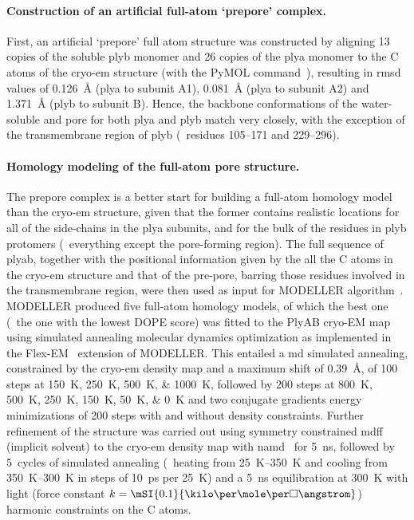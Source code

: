 \paragraph{Construction of an artificial full-atom `prepore' complex.}
%
First, an artificial `prepore' full atom structure was constructed by aligning 13 copies of the soluble
\gls{plyb} monomer and 26 copies of the \gls{plya} monomer to the C\ta{} atoms of the \gls{cryo-em} structure
(with the PyMOL  command~\cite{PyMOL}), resulting in \gls{rmsd} values of \SI{0.126}{\angstrom}
(\gls{plya} to subunit A1), \SI{0.081}{\angstrom} (\gls{plya} to subunit A2) and \SI{1.371}{\angstrom}
(\gls{plyb} to subunit B). Hence, the backbone conformations of the water-soluble and pore for both \gls{plya}
and \gls{plyb} match very closely, with the exception of the transmembrane region of \gls{plyb} (\ie~residues
\numrange{105}{171} and \numrange{229}{296}).

\paragraph{Homology modeling of the full-atom pore structure.}
%
The prepore complex is a better start for building a full-atom homology model than the \gls{cryo-em}
structure, given that the former contains realistic locations for all of the side-chains in the \gls{plya}
subunits, and for the bulk of the residues in \gls{plyb} protomers (\ie~everything except the pore-forming
region). The full sequence of \gls{plyab}, together with the positional information given by the all the
C\ta{} atoms in the \gls{cryo-em} structure and that of the pre-pore, barring those residues involved in the
transmembrane region, were then used as input for MODELLER  algorithm~\cite{Sali-1993}.
MODELLER produced five full-atom homology models, of which the best one (\ie~the one with the lowest DOPE
score) was fitted to the PlyAB cryo-EM map using simulated annealing molecular dynamics optimization as
implemented in the Flex-EM~\cite{Topf-2008} extension of MODELLER. This entailed a \gls{md} simulated
annealing, constrained by the \gls{cryo-em} density map and a maximum shift of \SI{0.39}{\angstrom}, of 100
steps at \SIlist{150;250;500;1000}{\kelvin}, followed by 200 steps at \SIlist{800;500;250;150;50;0}{\kelvin}
and two conjugate gradients energy minimizations of 200 steps with and without density constraints. Further
refinement of the structure was carried out using symmetry constrained \gls{mdff} (implicit solvent) to the
\gls{cryo-em} density map with \gls{namd}~\cite{Phillips-2005,McGreevy-2014} for \SI{5}{\ns}, followed by
5~cycles of simulated annealing (\ie~heating from \SIrange{25}{350}{\kelvin} and cooling from
\SIrange{350}{300}{\kelvin} in steps of \SI{10}{ps} per \SI{25}{\kelvin}) and a \SI{5}{\ns} equilibration at
\SI{300}{\kelvin} with light (force constant $k = \mSI{0.1}{\kilo\cal\per\mole\per\square\angstrom}$)
harmonic constraints on the C\ta{} atoms.

